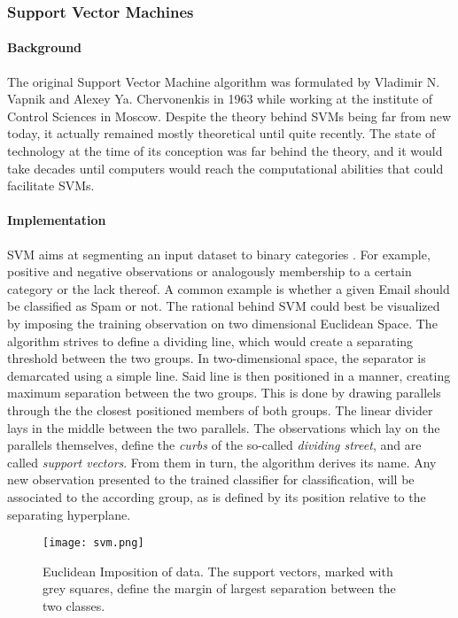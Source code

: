 \subsubsection{Support Vector Machines}
	
	\paragraph{Background}
	The original Support Vector Machine algorithm was formulated by Vladimir N. Vapnik and Alexey Ya. Chervonenkis in 1963 while working at the institute of Control Sciences in Moscow. Despite the theory behind SVMs being far from new today, it actually remained mostly theoretical until quite recently. The state of technology at the time of its conception was far behind the theory, and it would take decades until computers would reach the computational abilities that could facilitate SVMs.
	
	\paragraph{Implementation}
	SVM aims at segmenting an input dataset to binary categories \cite{SVM_burges1998tutorial} . For example, positive and negative observations or analogously membership to a certain category or the lack thereof. A common example is whether a given Email should be classified as Spam or not. The rational behind SVM could best be visualized by imposing the training observation on two dimensional Euclidean Space. The algorithm strives to define a dividing line, which would create a separating threshold between the two groups. In two-dimensional space, the separator is demarcated using a simple line. Said line is then positioned in a manner, creating maximum separation between the two groups. This is done by drawing parallels through the the closest positioned members of both groups. The linear divider lays in the middle between the two parallels. The observations which lay on the parallels themselves, define the \textit{curbs} of the so-called \textit{dividing street}, and are called \textit{support vectors}. From them in turn, the algorithm derives its name. Any new observation presented to the trained classifier for classification, will be associated to the according group, as is defined by its position relative to the separating hyperplane. 
	
	\begin{figure}[h]
		\centering
		\captionsetup{width=0.8\textwidth}
		\texttt{[image: svm.png]}
		\caption[SVM in Euclidean Space]{
			\footnotesize{
				Euclidean Imposition of data. The support vectors, marked with grey squares, define the margin of largest separation between the two classes.
			}
		} \cite{SVM_cortes1995support}
	\end{figure}

